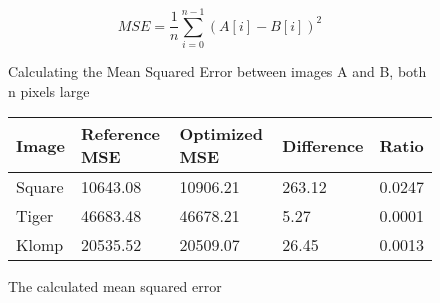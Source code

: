 \begin{figure}
    \begin{equation}
    MSE = \frac{1}{n} \sum_{i=0}^{n-1} (A[i] - B[i])^{2}
    \end{equation}
    \caption{Calculating the Mean Squared Error between images A and B, both n pixels large}
    \label{eq:mse}
\end{figure}

\begin{figure*}
    \centering
    \begin{tabular}{l | l l l l}
    Image   & Reference MSE & Optimized MSE & Difference    & Ratio     \\
    \hline
    Square  & 10643.08      & 10906.21      & 263.12        & 0.0247    \\
    Tiger   & 46683.48      & 46678.21      &   5.27        & 0.0001    \\
    Klomp   & 20535.52      & 20509.07      &  26.45        & 0.0013
    \end{tabular}
    \caption{The calculated mean squared error}
    \label{tab:mse}
\end{figure*}
